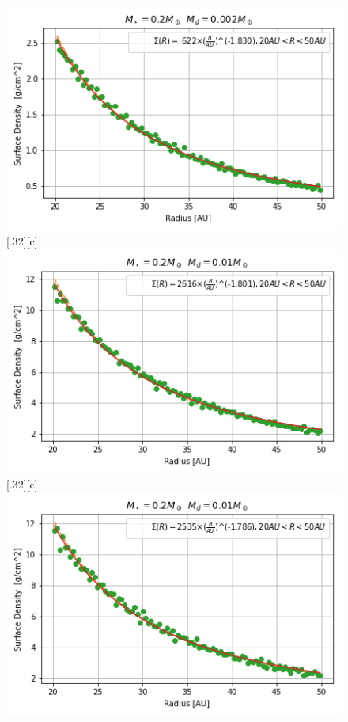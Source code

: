 \documentclass[aps,prb,twocolumn,superscriptaddress,floatfix,longbibliography]{revtex4-2}
\begin{document}
\begin{appendices}
\begin{figure}[!htbp]
{    \includegraphics[width=\linewidth]{Graphs_1D/r_0.2s_0.002d_0.7q_1D.png}}\quad
  \subcaptionbox*{}[.32\linewidth][c]{%
    \includegraphics[width=\linewidth]{Graphs_1D/r_0.2s_0.01d_0.3q_1D.png}}\quad
    \vspace{-2\baselineskip}
  \subcaptionbox*{}[.32\linewidth][c]{%
    \includegraphics[width=\linewidth]{Graphs_1D/r_0.2s_0.01d_0.5q_1D.png}}\quad

\end{figure}
\end{appendices}
\end{document}
